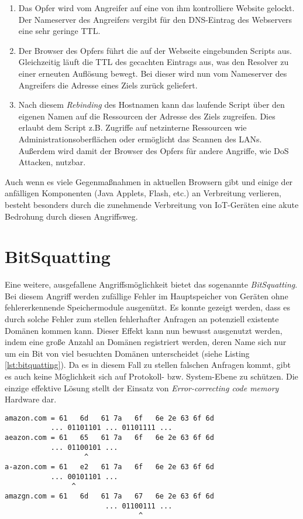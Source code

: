 \begin{enumerate}
    \item Das Opfer wird vom Angreifer auf eine von ihm kontrolliere Website gelockt. Der Nameserver des Angreifers vergibt für den DNS-Eintrag des Webservers eine sehr geringe TTL.
    \item Der Browser des Opfers führt die auf der Webseite eingebunden Scripts aus. Gleichzeitig läuft die TTL des gecachten Eintrags aus, was den Resolver zu einer erneuten Auflösung bewegt. Bei dieser wird nun vom Nameserver des Angreifers die Adresse eines Ziels zurück geliefert.
    \item Nach diesem \textit{Rebinding} des Hostnamen kann das laufende Script über den eigenen Namen auf die Ressourcen der Adresse des Ziels zugreifen. Dies erlaubt dem Script z.B. Zugriffe auf netzinterne Ressourcen wie Administrationsoberflächen oder ermöglicht das Scannen des LANs. Außerdem wird damit der Browser des Opfers für andere Angriffe, wie \ac{DoS} Attacken, nutzbar.   
\end{enumerate}

Auch wenn es viele Gegenmaßnahmen in aktuellen Browsern gibt und einige der anfälligen Komponenten (Java Applets, Flash, etc.) an Verbreitung verlieren, besteht besonders durch die zunehmende Verbreitung von IoT-Geräten eine akute Bedrohung durch diesen Angriffsweg\cite{Dorsey2018}. 

\section{BitSquatting}
Eine weitere, ausgefallene Angriffsmöglichkeit bietet das sogenannte \textit{BitSquatting}. Bei diesem Angriff werden zufällige Fehler im Hauptspeicher von Geräten ohne fehlererkennende Speichermodule ausgenützt. Es konnte gezeigt werden, dass es durch solche Fehler zum stellen fehlerhafter Anfragen an potenziell existente Domänen kommen kann\cite{Dinaburg2011}. Dieser Effekt kann nun bewusst ausgenutzt werden, indem eine große Anzahl an Domänen registriert werden, deren Name sich nur um ein Bit von viel besuchten Domänen unterscheidet (siehe Listing \ref{lst:bitquatting}). 
Da es in diesem Fall zu stellen falschen Anfragen kommt, gibt es auch keine Möglichkeit sich auf Protokoll- bzw. System-Ebene zu schützen. Die einzige effektive Lösung stellt der Einsatz von \textit{Error-correcting code memory} Hardware dar.  
\begin{lstlisting}[caption={Drei mögliche BitSquatting-Domänen für die Zieldomäne \texttt{amazon.com}}, label={lst:bitquatting}]
amazon.com = 61   6d   61 7a   6f   6e 2e 63 6f 6d
           ... 01101101 ... 01101111 ... 
aeazon.com = 61   65   61 7a   6f   6e 2e 63 6f 6d  
           ... 01100101 ...
                   ^
a-azon.com = 61   e2   61 7a   6f   6e 2e 63 6f 6d 
           ... 00101101 ...
                ^
amazgn.com = 61   6d   61 7a   67   6e 2e 63 6f 6d
                        ... 01100111 ...
                                ^
\end{lstlisting}

